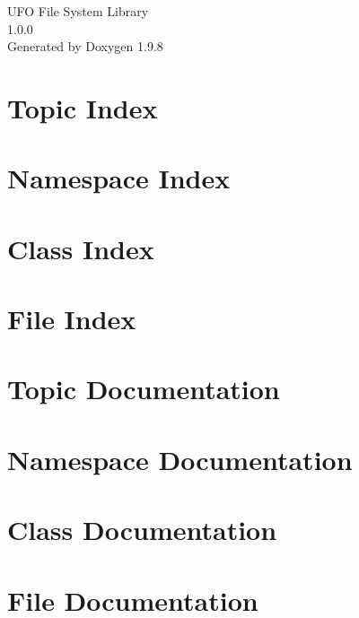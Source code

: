 \documentclass[twoside]{book}
\newcommand{\+}{\discretionary{\mbox{\scriptsize$\hookleftarrow$}}{}{}}
\newcommand{\clearemptydoublepage}{%
    \newpage{\pagestyle{empty}\cleardoublepage}%
  }
\begin{document}
  \raggedbottom
    \hypersetup{pageanchor=false,
                bookmarksnumbered=true,
                pdfencoding=unicode
               }
  \begin{titlepage}
  \vspace*{7cm}
  \begin{center}%
  {\Large UFO File System Library}\\
  [1ex]\large 1.\+0.\+0 \\
  \vspace*{1cm}
  {\large Generated by Doxygen 1.9.8}\\
  \end{center}
  \end{titlepage}
  \clearemptydoublepage
  \tableofcontents
  \clearemptydoublepage
  \hypersetup{pageanchor=true}
\chapter{Topic Index}

\chapter{Namespace Index}

\chapter{Class Index}

\chapter{File Index}

\chapter{Topic Documentation}




\chapter{Namespace Documentation}

\chapter{Class Documentation}



\chapter{File Documentation}






  \backmatter
  \newpage
  \clearemptydoublepage
  \printindex
\end{document}
